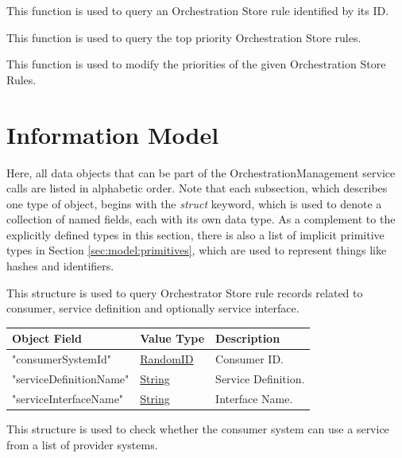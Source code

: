 \documentclass[a4paper]{arrowhead}
\newcommand{\pref}[1]{{\textcolor{ArrowheadGrey}{\hyperref[sec:model:primitives:#1]{#1}}}}
\begin{document}
This function is used to query an Orchestration Store rule identified by its ID.


This function is used to query the top priority Orchestration Store rules.


This function is used to modify the priorities of the given Orchestration Store Rules.


\newpage

\section{Information Model}
\label{sec:model}

Here, all data objects that can be part of the OrchestrationManagement service calls are listed in alphabetic order.
Note that each subsection, which describes one type of object, begins with the \textit{struct} keyword, which is used to denote a collection of named fields, each with its own data type.
As a complement to the explicitly defined types in this section, there is also a list of implicit primitive types in Section \ref{sec:model:primitives}, which are used to represent things like hashes and identifiers.


This structure is used to query Orchestrator Store rule records related to consumer, service definition and optionally service interface.

\begin{table}[ht!]
\begin{tabularx}{\textwidth}{| p{5cm} | p{5cm} | X |} \hline
\rowcolor{gray!33} Object Field & Value Type      & Description \\ \hline
"consumerSystemId"                & \pref{RandomID}     & Consumer ID. \\ \hline
"serviceDefinitionName"            & \pref{String}     & Service Definition. \\ \hline
"serviceInterfaceName"           & \pref{String}    & Interface Name. \\ \hline

\end{tabularx}
\end{table}



This structure is used to check whether the consumer system can use a service from a list of provider systems.
\end{document}
